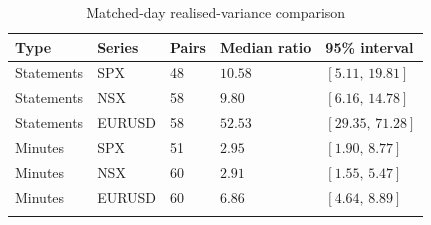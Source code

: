 \begin{table}[htbp]
\centering
{\fontsize{10}{12}\selectfont\renewcommand{\arraystretch}{1.22}\setlength{\tabcolsep}{4pt}
\begin{tabularx}{\linewidth}{@{}L{32mm}L{25mm}C{20mm}C{30mm}X@{}}
\toprule{}
\textbf{Type} & \textbf{Series} & \textbf{Pairs} & \textbf{Median ratio} & \textbf{95\% interval} \\ \midrule
Statements & SPX & 48 & $10.58$ & $[5.11,\,19.81]$ \\ \hline
Statements & NSX & 58 & $9.80$ & $[6.16,\,14.78]$ \\ \hline
Statements & EURUSD & 58 & $52.53$ & $[29.35,\,71.28]$ \\ \hline
Minutes & SPX & 51 & $2.95$ & $[1.90,\,8.77]$ \\ \hline
Minutes & NSX & 60 & $2.91$ & $[1.55,\,5.47]$ \\ \hline
Minutes & EURUSD & 60 & $6.86$ & $[4.64,\,8.89]$ \\ \hline
{}\bottomrule\end{tabularx}}
\caption[Matched-day realised-variance comparison]{Matched-day realised-variance comparison}\label{tab:rv}
\end{table}
